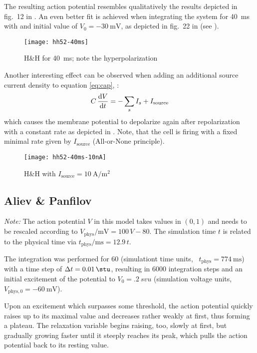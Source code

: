 The resulting action potential resembles qualitatively the results depicted in
fig.~12 in \cite{HH52}. An even better fit is achieved when integrating the
system for \SI{40}{\milli\second} with and initial value of
$V_0=\SI{-30}{\milli\volt}$, as depicted in fig.~22 in \cite{HH52} (see
).

\begin{figure}[h]
    \centering
    \texttt{[image: hh52-40ms]}
    \caption{H\&H for \SI{40}{\milli\second}; note the hyperpolarization}
    \label{fig:hh2}
\end{figure}

Another interesting effect can be observed when adding an additional source
current density to equation \eqref{eq:cap}, \ie:
\begin{equation*}
    C\,\dv{V}{t}=-\sum_{s}I_{s} + I_{\mathrm{source}}
\end{equation*}
which causes the membrane potential to depolarize again after repolarization
with a constant rate as depicted in . Note, that the cell is
firing with a fixed minimal rate given by $I_{\mathrm{source}}$ (All-or-None
principle).

\begin{figure}[h]
    \centering
    \texttt{[image: hh52-40ms-10nA]}
    \caption{H\&H with
        $I_{\mathrm{source}}=\SI{10}{\ampere\per\metre\squared}$}
    \label{fig:hh3}
\end{figure}


\subsection{Aliev \& Panfilov}
\emph{Note:} The action potential $V$ in this model takes values in $(0,1)$ and
needs to be rescaled according to
$V_{\mathrm{phys}}/\si{\milli\volt}=100\,V-80$. The simulation time $t$ is related
to the physical time via $t_{\mathrm{phys}}/\si{\milli\second}=12.9\,t$.

\vspace{\baselineskip}
The integration was performed for \SI{60}{\stu} (simulationt time units,
\ie~$t_{\mathrm{phys}}=\SI{774}{\milli\second}$) with a time step of
$\Delta{t}=\SI{.01}{\stu}$, resulting in 6000 integration steps and an initial
excitement of the potential to $V_0=\SI{.2}{svu}$ (simulation voltage units,
\ie~$V_{\mathrm{phys},0}=\SI{-60}{\milli\volt}$).

Upon an excitement which surpasses some threshold, the action potential quickly
raises up to its maximal value and decreases rather weakly at first, thus
forming a plateau. The relaxation variable begins raising, too, slowly at
first, but gradually growing faster until it steeply reaches its peak, which
pulls the action potential back to its resting value.

